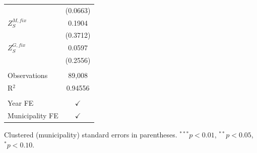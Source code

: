 \begin{tabular}{lc}
                   & (0.0663)\\   
   $Z^{M,fix}_S$   & 0.1904\\   
                   & (0.3712)\\   
   $Z^{G,fix}_S$   & 0.0597\\   
                   & (0.2556)\\   
    \\
   Observations    & 89,008\\  
   R$^2$           & 0.94556\\  
    \\
   Year FE         & $\checkmark$\\   
   Municipality FE & $\checkmark$\\   
   \bottomrule
\end{tabular}
 
\par \raggedright 
Clustered (municipality) standard errors in parentheses. $^{***}p<0.01$, $^{**}p<0.05$, $^{*}p<0.10$.
\par\endgroup
